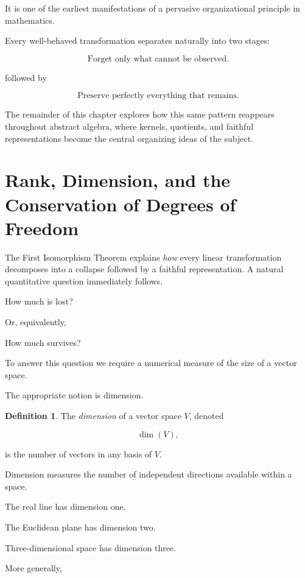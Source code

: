 \documentclass[11pt]{book}
\numberwithin{equation}{chapter}
\theoremstyle{definition}
\newtheorem{definition}{Definition}[chapter]
\theoremstyle{plain}
\theoremstyle{remark}
\begin{document}
It is one of the earliest manifestations of a pervasive organizational principle in mathematics.

Every well-behaved transformation separates naturally into two stages:

\[
\boxed{
\text{Forget only what cannot be observed.}
}
\]

followed by

\[
\boxed{
\text{Preserve perfectly everything that remains.}
}
\]

The remainder of this chapter explores how this same pattern reappears throughout abstract algebra, where kernels, quotients, and faithful representations become the central organizing ideas of the subject.


\section{Rank, Dimension, and the Conservation of Degrees of Freedom}

The First Isomorphism Theorem explains \emph{how} every linear transformation decomposes into a collapse followed by a faithful representation. A natural quantitative question immediately follows.

How much is lost?

Or, equivalently,

How much survives?

To answer this question we require a numerical measure of the size of a vector space.

The appropriate notion is dimension.

\begin{definition}
The \emph{dimension} of a vector space \(V\), denoted

\[
\dim(V),
\]

is the number of vectors in any basis of \(V\).
\end{definition}

Dimension measures the number of independent directions available within a space.

The real line has dimension one.

The Euclidean plane has dimension two.

Three-dimensional space has dimension three.

More generally,
\end{document}
